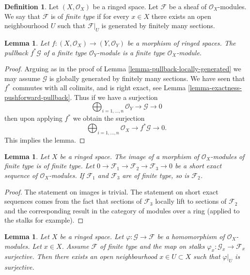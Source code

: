\documentclass{stacks-project}
\theoremstyle{plain}
\newtheorem{lemma}[subsection]{Lemma}
\theoremstyle{definition}
\newtheorem{definition}[subsection]{Definition}
\theoremstyle{remark}
\numberwithin{equation}{subsection}
\begin{document}
\begin{definition}
\label{definition-finite-type}
Let $(X, \mathcal{O}_X)$ be a ringed space.
Let $\mathcal{F}$ be a sheaf of $\mathcal{O}_X$-modules.
We say that $\mathcal{F}$ is of {\it finite type}
if for every $x \in X$ there exists an open
neighbourhood $U$ such that $\mathcal{F}|_U$
is generated by finitely many sections.
\end{definition}

\begin{lemma}
\label{lemma-pullback-finite-type}
Let $f : (X, \mathcal{O}_X) \to (Y, \mathcal{O}_Y)$
be a morphism of ringed spaces.
The pullback $f^*\mathcal{G}$ of a finite type
$\mathcal{O}_Y$-module is a finite type $\mathcal{O}_X$-module.
\end{lemma}

\begin{proof}
Arguing as in the proof of Lemma \ref{lemma-pullback-locally-generated}
we may assume $\mathcal{G}$ is globally generated by finitely
many sections.
We have seen that $f^*$ commutes with all colimits,
and is right exact, see Lemma \ref{lemma-exactness-pushforward-pullback}.
Thus if we have a surjection
$$
\bigoplus\nolimits_{i = 1, \ldots, n}
\mathcal{O}_Y
\to
\mathcal{G}
\to
0
$$
then upon applying $f^*$ we obtain the surjection
$$
\bigoplus\nolimits_{i = 1, \ldots, n}
\mathcal{O}_X
\to
f^*\mathcal{G}
\to
0.
$$
This implies the lemma.
\end{proof}

\begin{lemma}
\label{lemma-extension-finite-type}
Let $X$ be a ringed space.
The image of a morphism of $\mathcal{O}_X$-modules of finite
type is of finite type.
Let
$0 \to \mathcal{F}_1 \to \mathcal{F}_2 \to \mathcal{F}_3 \to 0$
be a short exact sequence of $\mathcal{O}_X$-modules.
If $\mathcal{F}_1$ and $\mathcal{F}_3$ are of finite type,
so is $\mathcal{F}_2$.
\end{lemma}

\begin{proof}
The statement on images is trivial.
The statement on short exact sequences comes from the
fact that sections of $\mathcal{F}_3$ locally lift to sections
of $\mathcal{F}_2$ and the corresponding result in
the category of modules over a ring (applied to the stalks
for example).
\end{proof}

\begin{lemma}
\label{lemma-finite-type-surjective-on-stalk}
Let $X$ be a ringed space.
Let $\varphi : \mathcal{G} \to \mathcal{F}$ be a homomorphism
of $\mathcal{O}_X$-modules.
Let $x \in X$. Assume $\mathcal{F}$ of finite type and
the map on stalks
$\varphi_x : \mathcal{G}_x \to \mathcal{F}_x$ surjective.
Then there exists an open neighbourhood
$x \in U \subset X$ such that $\varphi|_U$ is surjective.
\end{lemma}
\end{document}

